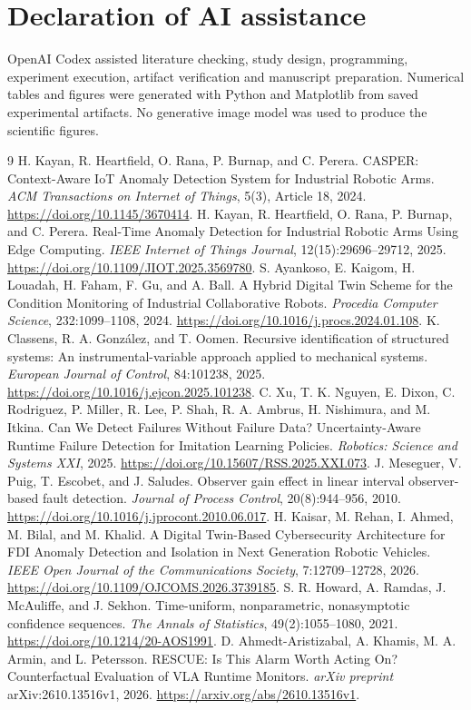 \documentclass[11pt]{article}
\begin{document}
\section*{Declaration of AI assistance}
OpenAI Codex assisted literature checking, study design, programming, experiment execution, artifact verification and manuscript preparation. Numerical tables and figures were generated with Python and Matplotlib from saved experimental artifacts. No generative image model was used to produce the scientific figures.

\begingroup{}
\begin{thebibliography}{9}
 H. Kayan, R. Heartfield, O. Rana, P. Burnap, and C. Perera. CASPER: Context-Aware IoT Anomaly Detection System for Industrial Robotic Arms. \emph{ACM Transactions on Internet of Things}, 5(3), Article 18, 2024. \url{https://doi.org/10.1145/3670414}.
 H. Kayan, R. Heartfield, O. Rana, P. Burnap, and C. Perera. Real-Time Anomaly Detection for Industrial Robotic Arms Using Edge Computing. \emph{IEEE Internet of Things Journal}, 12(15):29696--29712, 2025. \url{https://doi.org/10.1109/JIOT.2025.3569780}.
 S. Ayankoso, E. Kaigom, H. Louadah, H. Faham, F. Gu, and A. Ball. A Hybrid Digital Twin Scheme for the Condition Monitoring of Industrial Collaborative Robots. \emph{Procedia Computer Science}, 232:1099--1108, 2024. \url{https://doi.org/10.1016/j.procs.2024.01.108}.
 K. Classens, R. A. Gonz\'alez, and T. Oomen. Recursive identification of structured systems: An instrumental-variable approach applied to mechanical systems. \emph{European Journal of Control}, 84:101238, 2025. \url{https://doi.org/10.1016/j.ejcon.2025.101238}.
 C. Xu, T. K. Nguyen, E. Dixon, C. Rodriguez, P. Miller, R. Lee, P. Shah, R. A. Ambrus, H. Nishimura, and M. Itkina. Can We Detect Failures Without Failure Data? Uncertainty-Aware Runtime Failure Detection for Imitation Learning Policies. \emph{Robotics: Science and Systems XXI}, 2025. \url{https://doi.org/10.15607/RSS.2025.XXI.073}.
 J. Meseguer, V. Puig, T. Escobet, and J. Saludes. Observer gain effect in linear interval observer-based fault detection. \emph{Journal of Process Control}, 20(8):944--956, 2010. \url{https://doi.org/10.1016/j.jprocont.2010.06.017}.
 H. Kaisar, M. Rehan, I. Ahmed, M. Bilal, and M. Khalid. A Digital Twin-Based Cybersecurity Architecture for FDI Anomaly Detection and Isolation in Next Generation Robotic Vehicles. \emph{IEEE Open Journal of the Communications Society}, 7:12709--12728, 2026. \url{https://doi.org/10.1109/OJCOMS.2026.3739185}.
 S. R. Howard, A. Ramdas, J. McAuliffe, and J. Sekhon. Time-uniform, nonparametric, nonasymptotic confidence sequences. \emph{The Annals of Statistics}, 49(2):1055--1080, 2021. \url{https://doi.org/10.1214/20-AOS1991}.
 D. Ahmedt-Aristizabal, A. Khamis, M. A. Armin, and L. Petersson. RESCUE: Is This Alarm Worth Acting On? Counterfactual Evaluation of VLA Runtime Monitors. \emph{arXiv preprint} arXiv:2610.13516v1, 2026. \url{https://arxiv.org/abs/2610.13516v1}.
\end{thebibliography}
\endgroup
\end{document}
